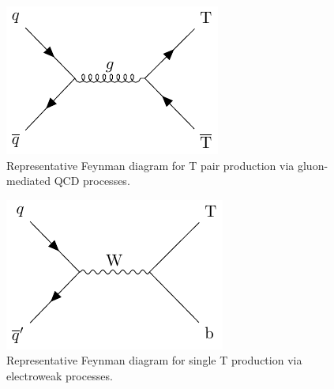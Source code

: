 \begin{figure}
\centering
\includegraphics[width=0.6\linewidth]{Images/T_prod_qcd.pdf}
\caption{Representative Feynman diagram for T pair production via gluon-mediated QCD processes.\label{fig:qcd_T_prod}}
\end{figure}

\begin{figure}
\centering
\includegraphics[width=0.6\linewidth]{Images/T_prod_qed.pdf}
\caption{Representative Feynman diagram for single T production via electroweak processes.\label{fig:qed_T_prod}}
\end{figure}



